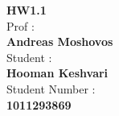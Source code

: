 \begin{center}
    \textbf{HW1.1}
    \\
    \vspace*{7mm}
    Prof :
    \\
    \vspace*{2mm}
    \textbf{\Large{Andreas Moshovos}}
    \\
    \vspace*{7mm}
    Student :
    \\
    \vspace*{2mm}
    \textbf{\Large{Hooman Keshvari}}
    \\
    \vspace*{7mm}
    Student Number :
    \\
    \vspace*{2mm}
    \textbf{\Large{1011293869}}
\end{center}